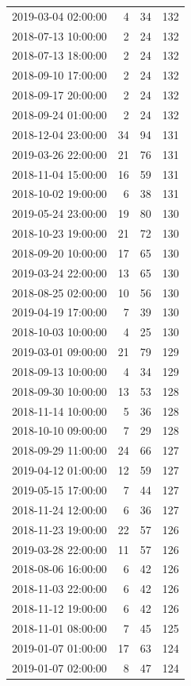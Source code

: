 \begin{tabular}{lrrr}
2019-03-04 02:00:00 & 4 & 34 & 132 \\
2018-07-13 10:00:00 & 2 & 24 & 132 \\
2018-07-13 18:00:00 & 2 & 24 & 132 \\
2018-09-10 17:00:00 & 2 & 24 & 132 \\
2018-09-17 20:00:00 & 2 & 24 & 132 \\
2018-09-24 01:00:00 & 2 & 24 & 132 \\
2018-12-04 23:00:00 & 34 & 94 & 131 \\
2019-03-26 22:00:00 & 21 & 76 & 131 \\
2018-11-04 15:00:00 & 16 & 59 & 131 \\
2018-10-02 19:00:00 & 6 & 38 & 131 \\
2019-05-24 23:00:00 & 19 & 80 & 130 \\
2018-10-23 19:00:00 & 21 & 72 & 130 \\
2018-09-20 10:00:00 & 17 & 65 & 130 \\
2019-03-24 22:00:00 & 13 & 65 & 130 \\
2018-08-25 02:00:00 & 10 & 56 & 130 \\
2019-04-19 17:00:00 & 7 & 39 & 130 \\
2018-10-03 10:00:00 & 4 & 25 & 130 \\
2019-03-01 09:00:00 & 21 & 79 & 129 \\
2018-09-13 10:00:00 & 4 & 34 & 129 \\
2018-09-30 10:00:00 & 13 & 53 & 128 \\
2018-11-14 10:00:00 & 5 & 36 & 128 \\
2018-10-10 09:00:00 & 7 & 29 & 128 \\
2018-09-29 11:00:00 & 24 & 66 & 127 \\
2019-04-12 01:00:00 & 12 & 59 & 127 \\
2019-05-15 17:00:00 & 7 & 44 & 127 \\
2018-11-24 12:00:00 & 6 & 36 & 127 \\
2018-11-23 19:00:00 & 22 & 57 & 126 \\
2019-03-28 22:00:00 & 11 & 57 & 126 \\
2018-08-06 16:00:00 & 6 & 42 & 126 \\
2018-11-03 22:00:00 & 6 & 42 & 126 \\
2018-11-12 19:00:00 & 6 & 42 & 126 \\
2018-11-01 08:00:00 & 7 & 45 & 125 \\
2019-01-07 01:00:00 & 17 & 63 & 124 \\
2019-01-07 02:00:00 & 8 & 47 & 124 \\

\end{tabular}
